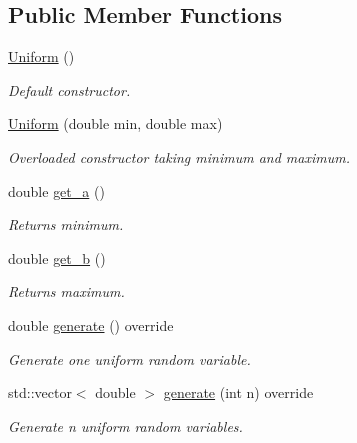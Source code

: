 \subsection*{Public Member Functions}
\begin{DoxyCompactItemize}
\item 
\mbox{\label{class_uniform_a55d4df320842397431ce1b57c43924e8}} 
\hyperlink{class_uniform_a55d4df320842397431ce1b57c43924e8}{Uniform} ()
\begin{DoxyCompactList}\small\item\em Default constructor. \end{DoxyCompactList}\item 
\mbox{\label{class_uniform_a9c9a8915fe92ac802a55dd3875045a73}} 
\hyperlink{class_uniform_a9c9a8915fe92ac802a55dd3875045a73}{Uniform} (double min, double max)
\begin{DoxyCompactList}\small\item\em Overloaded constructor taking minimum and maximum. \end{DoxyCompactList}\item 
\mbox{\label{class_uniform_a82e17d9668c7a2463a533c8fea9b2222}} 
double \hyperlink{class_uniform_a82e17d9668c7a2463a533c8fea9b2222}{get\+\_\+a} ()
\begin{DoxyCompactList}\small\item\em Returns minimum. \end{DoxyCompactList}\item 
\mbox{\label{class_uniform_a7bd95be60e4243b9b7157fa4fa32f8d9}} 
double \hyperlink{class_uniform_a7bd95be60e4243b9b7157fa4fa32f8d9}{get\+\_\+b} ()
\begin{DoxyCompactList}\small\item\em Returns maximum. \end{DoxyCompactList}\item 
\mbox{\label{class_uniform_ab9562a5945249b603a26f1c6e9be1091}} 
double \hyperlink{class_uniform_ab9562a5945249b603a26f1c6e9be1091}{generate} () override
\begin{DoxyCompactList}\small\item\em Generate one uniform random variable. \end{DoxyCompactList}\item 
\mbox{\label{class_uniform_a15f9f527e4e2dc35d1f0da34d9b21ed3}} 
std\+::vector$<$ double $>$ \hyperlink{class_uniform_a15f9f527e4e2dc35d1f0da34d9b21ed3}{generate} (int n) override
\begin{DoxyCompactList}\small\item\em Generate n uniform random variables. \end{DoxyCompactList}\end{DoxyCompactItemize}
